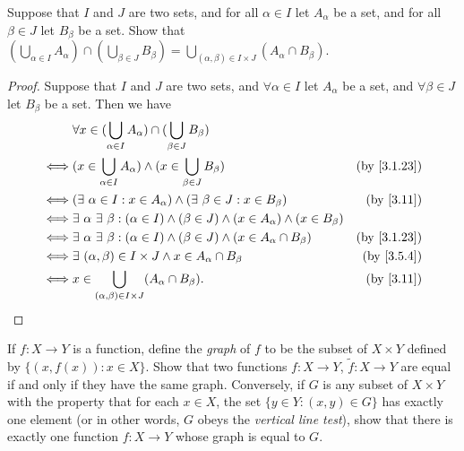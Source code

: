 \begin{exercise}\label{ex 3.5.9}
  Suppose that \(I\) and \(J\) are two sets, and for all \(\alpha \in I\) let \(A_{\alpha}\) be a set, and for all \(\beta \in J\) let \(B_{\beta}\) be a set.
  Show that \((\bigcup_{\alpha \in I} A_{\alpha}) \cap (\bigcup_{\beta \in J} B_{\beta}) = \bigcup_{(\alpha, \beta) \in I \times J} (A_{\alpha} \cap B_{\beta})\).
\end{exercise}

\begin{proof}
  Suppose that \(I\) and \(J\) are two sets, and \(\forall \alpha \in I\) let \(A_{\alpha}\) be a set, and \(\forall \beta \in J\) let \(B_{\beta}\) be a set.
  Then we have
  \begin{align*}
         & \forall x \in (\bigcup_{\alpha \in I} A_{\alpha}) \cap (\bigcup_{\beta \in J} B_{\beta})                                                           \\
    \iff & (x \in \bigcup_{\alpha \in I} A_{\alpha}) \land (x \in \bigcup_{\beta \in J} B_{\beta})                                & \text{(by \cref{3.1.23})} \\
    \iff & (\exists\ \alpha \in I : x \in A_{\alpha}) \land (\exists\ \beta \in J : x \in B_{\beta})                              & \text{(by \cref{3.11})}   \\
    \iff & \exists\ \alpha \ \exists\ \beta : (\alpha \in I) \land (\beta \in J) \land (x \in A_{\alpha}) \land (x \in B_{\beta})                             \\
    \iff & \exists\ \alpha \ \exists\ \beta : (\alpha \in I) \land (\beta \in J) \land (x \in A_{\alpha} \cap B_{\beta})          & \text{(by \cref{3.1.23})} \\
    \iff & \exists\ (\alpha, \beta) \in I \times J \land x \in A_{\alpha} \cap B_{\beta}                                          & \text{(by \cref{3.5.4})}  \\
    \iff & x \in \bigcup_{(\alpha, \beta) \in I \times J} (A_{\alpha} \cap B_{\beta}).                                            & \text{(by \cref{3.11})}
  \end{align*}
\end{proof}

\begin{exercise}\label{ex 3.5.10}
  If \(f : X \to Y\) is a function, define the \emph{graph} of \(f\) to be the subset of \(X \times Y\) defined by \(\{(x, f(x)) : x \in X\}\).
  Show that two functions \(f : X \to Y\), \(\tilde{f} : X \to Y\) are equal if and only if they have the same graph.
  Conversely, if \(G\) is any subset of \(X \times Y\) with the property that for each \(x \in X\), the set \(\{y \in Y : (x, y) \in G\}\) has exactly one element (or in other words, \(G\) obeys the \emph{vertical line test}), show that there is exactly one function \(f : X \to Y\) whose graph is equal to \(G\).
\end{exercise}

